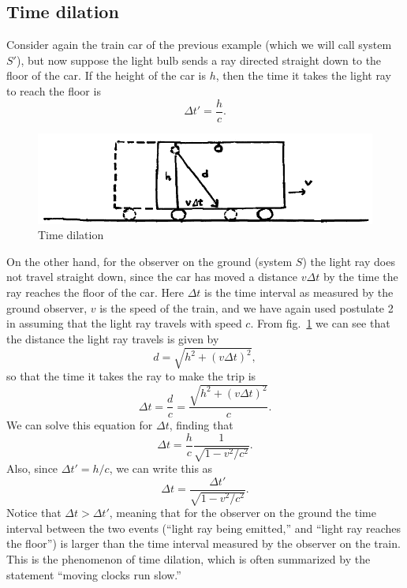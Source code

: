 \documentclass[11pt, a4paper,oneside,openright]{book}
\numberwithin{equation}{section}
\begin{document}
\subsection{Time dilation}

Consider again the train car of the previous example (which we will call system $S'$), but now suppose the light bulb sends a ray directed straight down to the floor of the car. If the height of the car is $h$, then the time it takes the light ray to reach the floor is
\begin{equation}
\Delta t'=\frac{h}{c}.
\end{equation}
\begin{figure}[ht]
\begin{center}
\includegraphics[scale=0.6]{Draw/lec2_2.png}
\end{center}
\caption{Time dilation}
\label{fig:lec2_2}
\end{figure}

\noindent
On the other hand, for the observer on the ground (system $S$) the light ray does not travel straight down, since the car has moved a distance $v\Delta t$ by the time the ray reaches the floor of the car. Here $\Delta t$ is the time interval as measured by the ground observer, $v$ is the speed of the train, and we have again used postulate 2 in assuming that the light ray travels with speed $c$. From fig.\ \ref{fig:lec2_2} we can see that the distance the light ray travels is given by
\begin{equation}
d=\sqrt{h^2+(v\Delta t)^2},
\end{equation}
so that the time it takes the ray to make the trip is
\begin{equation}
\Delta t=\frac{d}{c}=\frac{\sqrt{h^2+(v\Delta t)^2}}{c}.
\end{equation}
We can solve this equation for $\Delta t$, finding that
\begin{equation}
\Delta t=\frac{h}{c}\frac{1}{\sqrt{1-v^2/c^2}}.
\end{equation}
Also, since $\Delta t'=h/c$, we can write this as
\begin{equation} \label{eq:time_dilation}
\Delta t=\frac{\Delta t'}{\sqrt{1-v^2/c^2}}.
\end{equation}
Notice that $\Delta t>\Delta t'$, meaning that for the observer on the ground the time interval between the two events (``light ray being emitted,'' and ``light ray reaches the floor'') is larger than the time interval measured by the observer on the train. This is the phenomenon of time dilation, which is often summarized by the statement ``moving clocks run slow.''
\end{document}
